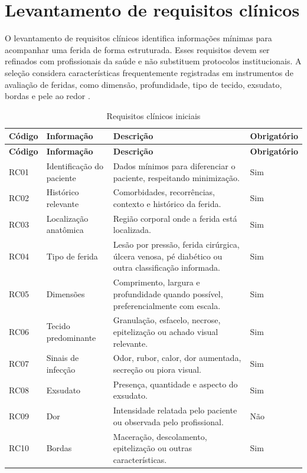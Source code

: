 \documentclass[
    12pt,
    oneside,
    a4paper,
    chapter=TITLE,
    brazil,
    sumario=tradicional,
    hidelinks
]{abntex2}
\begin{document}
\chapter{Levantamento de requisitos clínicos}

O levantamento de requisitos clínicos identifica informações mínimas para acompanhar uma ferida de forma estruturada. Esses requisitos devem ser refinados com profissionais da saúde e não substituem protocolos institucionais. A seleção considera características frequentemente registradas em instrumentos de avaliação de feridas, como dimensão, profundidade, tipo de tecido, exsudato, bordas e pele ao redor \cite{batesjensen2019,alves2015}.

\begin{longtable}{L{1.8cm}L{3.2cm}L{7.0cm}C{1.8cm}}
\caption{\label{tab:requisitos-clinicos}Requisitos clínicos iniciais}\\
\toprule
\textbf{Código} & \textbf{Informação} & \textbf{Descrição} & \textbf{Obrigatório} \\
\midrule
\endfirsthead
\toprule
\textbf{Código} & \textbf{Informação} & \textbf{Descrição} & \textbf{Obrigatório} \\
\midrule
\endhead
RC01 & Identificação do paciente & Dados mínimos para diferenciar o paciente, respeitando minimização. & Sim \\
RC02 & Histórico relevante & Comorbidades, recorrências, contexto e histórico da ferida. & Sim \\
RC03 & Localização anatômica & Região corporal onde a ferida está localizada. & Sim \\
RC04 & Tipo de ferida & Lesão por pressão, ferida cirúrgica, úlcera venosa, pé diabético ou outra classificação informada. & Sim \\
RC05 & Dimensões & Comprimento, largura e profundidade quando possível, preferencialmente com escala. & Sim \\
RC06 & Tecido predominante & Granulação, esfacelo, necrose, epitelização ou achado visual relevante. & Sim \\
RC07 & Sinais de infecção & Odor, rubor, calor, dor aumentada, secreção ou piora visual. & Sim \\
RC08 & Exsudato & Presença, quantidade e aspecto do exsudato. & Sim \\
RC09 & Dor & Intensidade relatada pelo paciente ou observada pelo profissional. & Não \\
RC10 & Bordas & Maceração, descolamento, epitelização ou outras características. & Sim \\

\end{longtable}
\end{document}
